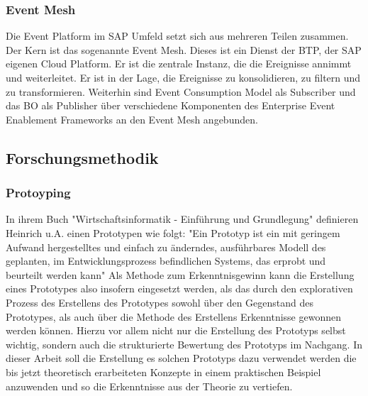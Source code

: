 \subsubsection*{Event Mesh}
Die Event Platform im  SAP Umfeld setzt sich aus mehreren Teilen zusammen. Der Kern ist das sogenannte Event Mesh. Dieses ist ein Dienst der \ac{BTP}, der SAP eigenen Cloud Platform. Er ist die zentrale Instanz, die die Ereignisse annimmt und weiterleitet. Er ist in der Lage, die Ereignisse zu konsolidieren, zu filtern und zu transformieren. Weiterhin sind Event Consumption Model als Subscriber und das \ac{BO} als Publisher über verschiedene Komponenten des Enterprise Event Enablement Frameworks an den Event Mesh angebunden.\ \cite[Vgl.][]{sapse_evm}

\subsection{Forschungsmethodik}
\subsubsection*{Protoyping}
\label{Protoyping}
In ihrem Buch "Wirtschaftsinformatik - Einführung und Grundlegung" definieren Heinrich u.A. einen Prototypen wie folgt: "Ein Prototyp ist ein mit geringem Aufwand hergestelltes und einfach zu änderndes, ausführbares Modell des geplanten, im Entwicklungsprozess befindlichen Systems, das erprobt und beurteilt werden kann" \cite[S. 114]{heinrich2007wirtschaftsinformatik}
Als Methode zum Erkenntnisgewinn kann die Erstellung eines Prototypes also insofern eingesetzt werden, als das durch den explorativen Prozess des Erstellens des Prototypes sowohl über den Gegenstand des Prototypes, als auch über die Methode des Erstellens Erkenntnisse gewonnen werden können. Hierzu vor allem nicht nur die Erstellung des Prototyps selbst wichtig, sondern auch die strukturierte Bewertung des Prototyps im Nachgang. \cite[S. 119]{heinrich2007wirtschaftsinformatik} In dieser Arbeit soll die Erstellung es solchen Prototyps dazu verwendet werden die bis jetzt theoretisch erarbeiteten Konzepte in einem praktischen Beispiel anzuwenden und so die Erkenntnisse aus der Theorie zu vertiefen.



